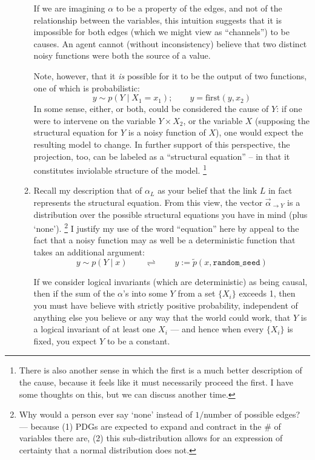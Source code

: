 \documentclass{article}
\theoremstyle{plain}
\theoremstyle{definition}
\theoremstyle{remark}
\begin{document}
\begin{enumerate}[itemsep=1em]
\begin{enumerate}[itemsep=1em]
	If we are imagining $\alpha$ to be a property of the edges, and not of the relationship between the variables, this intuition suggests that it is impossible for both edges (which we might view as ``channels'') to be causes. An agent cannot (without inconsistency) believe that two distinct noisy functions were both the source of a value.  
	
	Note, however, that it \emph{is} possible for it to be the output of two functions, one of which is probabilistic:
	\[ y \sim p(Y \mid X_1 = x_1); \qquad y = \text{first}(y, x_2) \]
	In some sense, either, or both, could be considered the cause of $Y$: if one were to intervene on the variable $Y \times X_2$, or the variable $X$ (supposing the structural equation for $Y$ is a noisy function of $X$), one would expect the resulting model to change. In further support of this perspective, the projection, too, can be labeled as a ``structural equation'' -- in that it constitutes inviolable structure of the model.%
		\footnote{There is also another sense in which the first is a much better description of the cause, because it feels like it must necessarily proceed the first. I have some thoughts on this, but we can discuss another time.}
	
	\item  Recall my description that of $\alpha_L$ as your belief that the link $L$ in fact represents the structural equation. From this view, the vector $\vec \alpha_{\to Y}$ is a distribution over the possible structural equations you have in mind (plus `none').%
		\footnote{Why would a person ever say `none' instead of $1/$number of possible edges? --- because (1) PDGs are expected to expand and contract in the \# of variables there are, (2) this sub-distribution allows for an expression of certainty that a normal distribution does not.}
	I justify my use of the word ``equation'' here by appeal to the fact that a noisy function may as well be a deterministic function that takes an additional argument:
	\[ y \sim p(Y \mid x) \qquad \rightleftharpoons \qquad y := \tilde p(x, \texttt{random\_seed}) \] 
	
	If we consider logical invariants (which are deterministic) as being causal, then if the sum of the $\alpha$'s into some $Y$ from a set $\{X_i\}$ exceeds 1, then you must have believe with strictly positive probability, independent of anything else you believe or any way that the world could work, that $Y$ is a logical invariant of at least one $X_i$ --- and hence when every $\{X_i\}$ is fixed, you expect $Y$ to be a constant.
	

\end{enumerate}
\end{enumerate}
\end{document}
